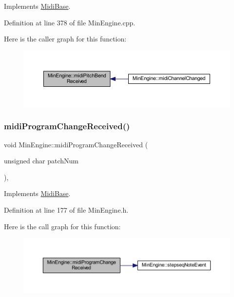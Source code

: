 Implements \hyperlink{class_midi_base_acfb1d2aef9901779bb53e0847121c13d}{Midi\+Base}.



Definition at line 378 of file Min\+Engine.\+cpp.

Here is the caller graph for this function\+:
\nopagebreak
\begin{figure}[H]
\begin{center}
\leavevmode
\includegraphics[width=350pt]{d4/d0f/class_min_engine_a5b0f6a252cc4958e81d8989872105544_icgraph}
\end{center}
\end{figure}
\mbox{\label{class_min_engine_a0e772deba3710b21ef14f7a72994edb1}} 
\subsubsection{\texorpdfstring{midi\+Program\+Change\+Received()}{midiProgramChangeReceived()}}
{\footnotesize\ttfamily void Min\+Engine\+::midi\+Program\+Change\+Received (\begin{DoxyParamCaption}\item[{unsigned char}]{patch\+Num }\end{DoxyParamCaption})\hspace{0.3cm}{\ttfamily [inline]}, {\ttfamily [virtual]}}



Implements \hyperlink{class_midi_base_a968da0cf67e9a84757cbc2dbce90bc39}{Midi\+Base}.



Definition at line 177 of file Min\+Engine.\+h.

Here is the call graph for this function\+:
\nopagebreak
\begin{figure}[H]
\begin{center}
\leavevmode
\includegraphics[width=350pt]{d4/d0f/class_min_engine_a0e772deba3710b21ef14f7a72994edb1_cgraph}
\end{center}
\end{figure}
\mbox{\label{class_min_engine_ac424a71b7b8e28ce4e6cd47bda488704}} 
